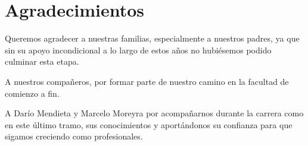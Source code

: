 \chapter*{Agradecimientos}

Queremos agradecer a nuestras familias, especialmente a nuestros padres, ya que sin su apoyo incondicional a lo largo de estos años no hubiésemos podido culminar esta etapa.

A nuestros compañeros, por formar parte de nuestro camino en la facultad de comienzo a fin.

A Darío Mendieta y Marcelo Moreyra por acompañarnos durante la carrera como en este último tramo,
sus conocimientos y aportándonos su confianza para que sigamos creciendo como profesionales.

